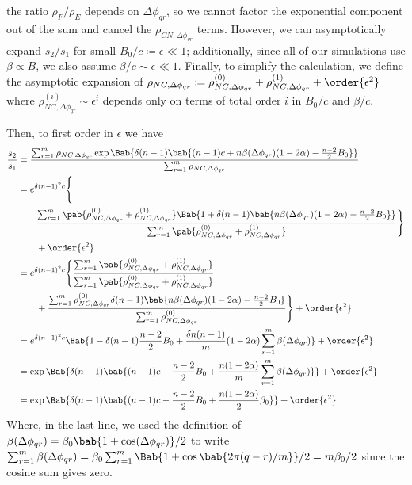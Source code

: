 \documentclass[10pt,letterpaper]{article}
\begin{document}
the ratio $\rho_F/\rho_E$ depends on $\Delta \phi_{qr}$,
so we cannot factor the exponential component out of the sum
and cancel the $\rho_{CN,\Delta \phi_{qr}}$ terms.
However, we can asymptotically expand $s_2/s_1$ for small
$B_0/c \coloneqq \epsilon \ll 1$;
additionally, since all of our simulations use $\beta \propto B$,
we also assume $\beta/c \sim \epsilon \ll 1$.
Finally, to simplify the calculation,
we define the asymptotic expansion of
$\rho_{NC,\Delta \phi_{qr}} \coloneqq
\rho_{NC,\Delta \phi_{qr}}^{(0)}
+
\rho_{NC,\Delta \phi_{qr}}^{(1)}
+
\order{\epsilon^2}
$
where
$
\rho_{NC,\Delta \phi_{qr}}^{(i)} \sim \epsilon^i
$
depends only on terms of total order $i$ in $B_0/c$ and $\beta/c$.

Then, to first order in $\epsilon$
we have
\begin{align*}
  \frac{s_2}{s_1}
  &=
  \frac
  {\sum_{r=1}^{m} \rho_{NC,\Delta \phi_{qr}}
    \exp \Bab{
      \delta (n-1)
      \bab{
        (n-1) c + n \beta(\Delta \phi_{qr}) (1 - 2 \alpha)
        - \frac{n-2}{2} B_0
      }
    }
  }
  {\sum_{r=1}^{m} \rho_{NC,\Delta \phi_{qr}}}
  \\
  &=
  e^{\delta (n-1)^2 c}
  \Biggl\{
  \\
  &\qquad
  \frac
  {\sum_{r=1}^{m}
    \pab{
      \rho_{NC,\Delta \phi_{qr}}^{(0)}
      +
      \rho_{NC,\Delta \phi_{qr}}^{(1)}
    }
    \Bab{1 +
      \delta (n-1)
      \bab{
        n \beta(\Delta \phi_{qr}) (1 - 2 \alpha)
        - \frac{n-2}{2} B_0
      }
    }
  }
  {\sum_{r=1}^{m} \pab{
    \rho_{NC,\Delta \phi_{qr}}^{(0)}
    +
    \rho_{NC,\Delta \phi_{qr}}^{(1)}
  }}
  \Biggr\}
  \\
  &\qquad
  + \order{\epsilon^2}
  \\
  &=
  e^{\delta (n-1)^2 c}
  \Biggl\{
  \frac
  {\sum_{r=1}^{m}
    \pab{
      \rho_{NC,\Delta \phi_{qr}}^{(0)}
      +
      \rho_{NC,\Delta \phi_{qr}}^{(1)}
    }
  }
  {\sum_{r=1}^{m} \pab{
    \rho_{NC,\Delta \phi_{qr}}^{(0)}
    +
    \rho_{NC,\Delta \phi_{qr}}^{(1)}
  }}
  \\
  &\qquad
  +
  \frac
  {\sum_{r=1}^{m} \rho_{NC,\Delta \phi_{qr}}^{(0)}
    \delta (n-1)
    \bab{
      n \beta(\Delta \phi_{qr}) (1 - 2 \alpha)
      - \frac{n-2}{2} B_0
    }
  }
  {\sum_{r=1}^{m} \rho_{NC,\Delta \phi_{qr}}^{(0)}
  }
  \Biggr\}
  + \order{\epsilon^2}
  \\
  &=
  e^{\delta (n-1)^2 c}
  \Bab{
    1
    - \delta (n-1) \frac{n-2}{2} B_0
    +
    \frac{\delta n (n-1)}{m} (1 - 2 \alpha)
    \sum_{r=1}^{m} \beta(\Delta \phi_{qr})
  }
  + \order{\epsilon^2}
  \\
  &=
  \exp \Bab{\delta (n-1) \bab{
    (n-1) c
    - \frac{n-2}{2} B_0
    +
    \frac{n (1 - 2 \alpha)}{m}
    \sum_{r=1}^{m} \beta(\Delta \phi_{qr})
  }}
  + \order{\epsilon^2}
  \\
  &=
  \exp \Bab{ \delta (n-1) \bab{
    (n-1) c
    - \frac{n-2}{2} B_0
    +
    \frac{n (1 - 2 \alpha)}{2} \beta_0
  }}
  + \order{\epsilon^2}
\end{align*}
Where, in the last line, we used
the definition of
$\beta(\Delta \phi_{qr}) = \beta_0 \bab{1 + \cos(\Delta \phi_{qr})}/2$
to write
$\sum_{r=1}^m \beta(\Delta \phi_{qr})
= \beta_0 \sum_{r=1}^m \Bab{1 + \cos\bab{2 \pi (q-r)/m}}/2
= m \beta_0/2$
since the cosine sum gives zero.
\end{document}
